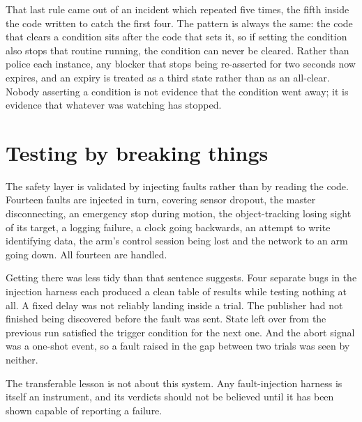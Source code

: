 That last rule came out of an incident which repeated five times, the fifth
inside the code written to catch the first four. The pattern is always the
same: the code that clears a condition sits after the code that sets it, so if
setting the condition also stops that routine running, the condition can never
be cleared. Rather than police each instance, any blocker that stops being
re-asserted for two seconds now expires, and an expiry is treated as a third
state rather than as an all-clear. Nobody asserting a condition is not evidence
that the condition went away; it is evidence that whatever was watching has
stopped.

\section{Testing by breaking things}

The safety layer is validated by injecting faults rather than by reading the
code. Fourteen faults are injected in turn, covering sensor dropout, the
master disconnecting, an emergency stop during motion, the object-tracking
losing sight of its target, a logging failure, a clock going backwards, an
attempt to write identifying data, the arm's control session being lost and
the network to an arm going down. All fourteen are handled.

Getting there was less tidy than that sentence suggests. Four separate bugs in
the injection harness each produced a clean table of results while testing
nothing at all. A fixed delay was not reliably landing inside a trial. The
publisher had not finished being discovered before the fault was sent. State
left over from the previous run satisfied the trigger condition for the next
one. And the abort signal was a one-shot event, so a fault raised in the gap
between two trials was seen by neither.

The transferable lesson is not about this system. Any fault-injection harness
is itself an instrument, and its verdicts should not be believed until it has
been shown capable of reporting a failure.

